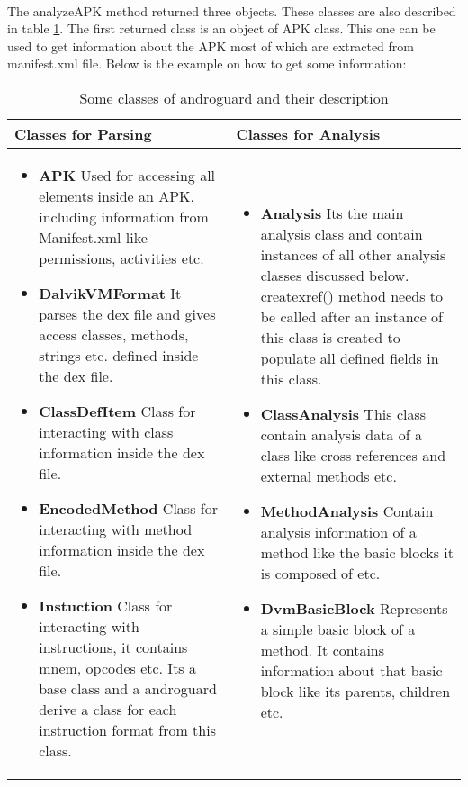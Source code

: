 \documentclass[../main.tex]{subfile}
\begin{document}
			\paragraph{} The analyzeAPK method returned three objects. These classes are also described in table \ref{table:androguard_classes}. The first returned class is an object of APK class. This one can be used to get information about the APK most of which are extracted from manifest.xml file. Below is the example on how to get some information:
			
			\begin{table}[H]
				\begin{center}
					\begin{tabular}{|p{5cm}|p{5cm}|}
						\hline \textbf{Classes for Parsing} & \textbf{Classes for Analysis}\\ \hline
						\begin{itemize}
							\item \textbf{APK} Used for accessing all elements inside an APK, including information from Manifest.xml like permissions, activities etc.
							\item \textbf{DalvikVMFormat}	It parses the dex file and gives access classes, methods, strings etc. defined inside the dex file.
							\item \textbf{ClassDefItem} Class for interacting with class information inside the dex file.
							\item \textbf{EncodedMethod} Class for interacting with method information inside the dex file. 
							\item \textbf{Instuction} Class for interacting with instructions, it contains mnem, opcodes etc. Its a base class and a androguard derive a class for each instruction format from this class.
						\end{itemize}
						
						&
						
						\begin{itemize}
							\item \textbf{Analysis} Its the main analysis class and contain instances of all other analysis classes discussed below. create\textunderscore xref() method needs to be called after an instance of this class is created to populate all defined fields in this class.
							\item \textbf{ClassAnalysis} This class contain analysis data of a class like cross references and external methods etc.
							\item \textbf{MethodAnalysis} Contain analysis information of a method like the basic blocks it is composed of etc.
							\item \textbf{DvmBasicBlock} Represents a simple basic block of a method. It contains information about that basic block like its parents, children etc.
						\end{itemize}\\ \hline
						
					\end{tabular}
				\end{center}
				\caption{Some classes of androguard and their description}
				\label{table:androguard_classes}
			\end{table}
		
\end{document}
